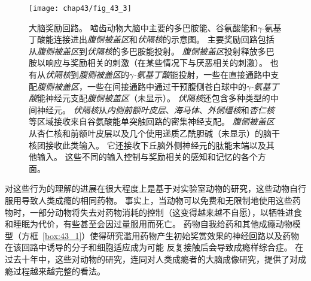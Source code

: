 \begin{figure}[htbp]
	\centering
	\texttt{[image: chap43/fig\_43\_3]}
	\caption{大脑奖励回路。
		啮齿动物大脑中主要的多巴胺能、谷氨酸能和$\gamma$-氨基丁酸能连接进出\textit{腹侧被盖区}和\textit{伏隔核}的示意图。
		主要奖励回路包括从\textit{腹侧被盖区}到\textit{伏隔核}的多巴胺能投射。
		\textit{腹侧被盖区}投射释放多巴胺以响应与奖励相关的刺激（在某些情况下与厌恶相关的刺激）。
		也有从\textit{伏隔核}到\textit{腹侧被盖区}的\textit{$\gamma$-氨基丁酸}能投射，一些在直接通路中支配\textit{腹侧被盖区}，一些在间接通路中通过干预腹侧苍白球中的\textit{$\gamma$-氨基丁酸}能神经元支配\textit{腹侧被盖区}（未显示）。
		\textit{伏隔核}还包含多种类型的中间神经元。
		\textit{伏隔核}从\textit{内侧前额叶皮层}、\textit{海马体}、\textit{外侧缰核}和\textit{杏仁核}等区域接收来自谷氨酸能单突触回路的密集神经支配。
		\textit{腹侧被盖区}从杏仁核和前额叶皮层以及几个使用递质乙酰胆碱（未显示）的脑干核团接收此类输入。
		它还接收下丘脑外侧神经元的肽能末端以及其他输入。
		这些不同的输入控制与奖励相关的感知和记忆的各个方面\cite{russo2013brain}。}
	\label{fig:43_3}
\end{figure}


对这些行为的理解的进展在很大程度上是基于对实验室动物的研究，这些动物自行服用导致人类成瘾的相同药物。
事实上，当动物可以免费和无限制地使用这些药物时，一部分动物将失去对药物消耗的控制（这变得越来越不自愿），以牺牲进食和睡眠为代价，有些甚至会因过量服用而死亡。
药物自我给药和其他成瘾动物模型（方框~\ref{box:43_1}）使得研究滥用药物产生初始奖赏效果的神经回路以及药物在该回路中诱导的分子和细胞适应成为可能 反复接触后会导致成瘾样综合症。
在过去十年中，这些对动物的研究，连同对人类成瘾者的大脑成像研究，提供了对成瘾过程越来越完整的看法。


